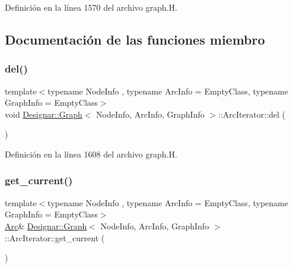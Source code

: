 Definición en la línea 1570 del archivo graph.\+H.



\subsection{Documentación de las funciones miembro}
\mbox{\label{class_designar_1_1_graph_1_1_arc_iterator_a6375bb0513856b2b20dffbfb2496082e}} 
\subsubsection{\texorpdfstring{del()}{del()}}
{\footnotesize\ttfamily template$<$typename Node\+Info , typename Arc\+Info  = Empty\+Class, typename Graph\+Info  = Empty\+Class$>$ \\
void \hyperlink{class_designar_1_1_graph}{Designar\+::\+Graph}$<$ Node\+Info, Arc\+Info, Graph\+Info $>$\+::Arc\+Iterator\+::del (\begin{DoxyParamCaption}{ }\end{DoxyParamCaption})\hspace{0.3cm}{\ttfamily [inline]}}



Definición en la línea 1608 del archivo graph.\+H.

\mbox{\label{class_designar_1_1_graph_1_1_arc_iterator_a4915ccaef38293e9dc449e7dba3965ec}} 
\subsubsection{\texorpdfstring{get\+\_\+current()}{get\_current()}\hspace{0.1cm}{\footnotesize\ttfamily [1/2]}}
{\footnotesize\ttfamily template$<$typename Node\+Info , typename Arc\+Info  = Empty\+Class, typename Graph\+Info  = Empty\+Class$>$ \\
\hyperlink{class_designar_1_1_graph_a74c730ef4ce2d20f998d72bd25c2b5bf}{Arc}\& \hyperlink{class_designar_1_1_graph}{Designar\+::\+Graph}$<$ Node\+Info, Arc\+Info, Graph\+Info $>$\+::Arc\+Iterator\+::get\+\_\+current (\begin{DoxyParamCaption}{ }\end{DoxyParamCaption})\hspace{0.3cm}{\ttfamily [inline]}}




